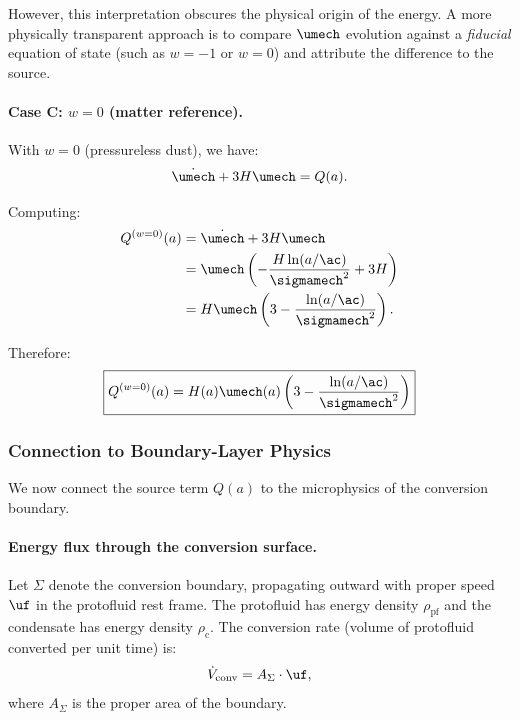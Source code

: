 However, this interpretation obscures the physical origin of the energy. A more physically transparent approach is to compare $\umech$ evolution against a \emph{fiducial} equation of state (such as $w = -1$ or $w = 0$) and attribute the difference to the source.

\paragraph{Case C: $w = 0$ (matter reference).}

With $w = 0$ (pressureless dust), we have:
\begin{equation}
\dot{\umech} + 3H\umech = Q(a).
\end{equation}

Computing:
\begin{align}
Q^{(w=0)}(a) &= \dot{\umech} + 3H\umech \notag \\
&= \umech \left( -\frac{H\ln(a/\ac)}{\sigmamech^2} + 3H \right) \notag \\
&= H\umech \left( 3 - \frac{\ln(a/\ac)}{\sigmamech^2} \right).
\end{align}

Therefore:
\begin{equation}
\label{eq:Q_case_C}
\boxed{Q^{(w=0)}(a) = H(a)\umech(a) \left( 3 - \frac{\ln(a/\ac)}{\sigmamech^2} \right)}
\end{equation}

\subsubsection{Connection to Boundary-Layer Physics}

We now connect the source term $Q(a)$ to the microphysics of the conversion boundary.

\paragraph{Energy flux through the conversion surface.}

Let $\Sigma$ denote the conversion boundary, propagating outward with proper speed $\uf$ in the protofluid rest frame. The protofluid has energy density $\rho_{\mathrm{pf}}$ and the condensate has energy density $\rho_{\mathrm{c}}$. The conversion rate (volume of protofluid converted per unit time) is:
\begin{equation}
\dot{V}_{\mathrm{conv}} = A_\Sigma \cdot \uf,
\end{equation}
where $A_\Sigma$ is the proper area of the boundary.

